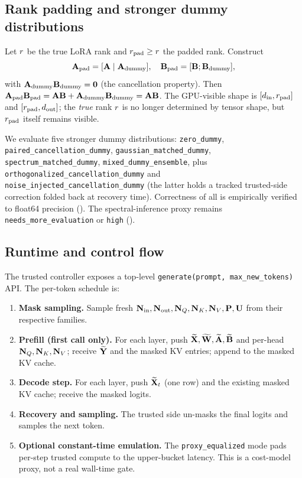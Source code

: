 \subsection{Rank padding and stronger dummy distributions}
\label{sec:design:rank-pad}
Let $r$ be the true LoRA rank and $r_{\mathrm{pad}} \geq r$ the padded rank. Construct
\begin{equation}
\mathbf{A}_{\mathrm{pad}} = [\mathbf{A} \mid \mathbf{A}_{\mathrm{dummy}}], \quad \mathbf{B}_{\mathrm{pad}} = [\mathbf{B}; \mathbf{B}_{\mathrm{dummy}}],
\end{equation}
with $\mathbf{A}_{\mathrm{dummy}}\mathbf{B}_{\mathrm{dummy}} = \mathbf{0}$ (the cancellation property). Then $\mathbf{A}_{\mathrm{pad}}\mathbf{B}_{\mathrm{pad}} = \mathbf{A}\mathbf{B} + \mathbf{A}_{\mathrm{dummy}}\mathbf{B}_{\mathrm{dummy}} = \mathbf{A}\mathbf{B}$. The GPU-visible shape is $[d_{\mathrm{in}}, r_{\mathrm{pad}}]$ and $[r_{\mathrm{pad}}, d_{\mathrm{out}}]$; the \emph{true} rank $r$ is no longer determined by tensor shape, but $r_{\mathrm{pad}}$ itself remains visible.

We evaluate five stronger dummy distributions: \texttt{zero\_dummy}, \texttt{paired\_cancellation\_dummy}, \texttt{gaussian\_matched\_dummy}, \texttt{spectrum\_matched\_dummy}, \texttt{mixed\_dummy\_ensemble}, plus \texttt{orthogonalized\_cancellation\_dummy} and \texttt{noise\_injected\_cancellation\_dummy} (the latter holds a tracked trusted-side correction folded back at recovery time). Correctness of all is empirically verified to float64 precision (). The spectral-inference proxy remains \texttt{needs\_more\_evaluation} or \texttt{high} ().

\subsection{Runtime and control flow}
\label{sec:design:runtime}
The trusted controller exposes a top-level \texttt{generate(prompt, max\_new\_tokens)} API. The per-token schedule is:

\begin{enumerate}[leftmargin=*, nosep]
  \item \textbf{Mask sampling.} Sample fresh $\mathbf{N}_{\mathrm{in}}, \mathbf{N}_{\mathrm{out}}, \mathbf{N}_{Q}, \mathbf{N}_{K}, \mathbf{N}_{V}, \mathbf{P}, \mathbf{U}$ from their respective families.
  \item \textbf{Prefill (first call only).} For each layer, push $\widetilde{\mathbf{X}}, \widetilde{\mathbf{W}}, \widetilde{\mathbf{A}}, \widetilde{\mathbf{B}}$ and per-head $\mathbf{N}_{Q}, \mathbf{N}_{K}, \mathbf{N}_{V}$; receive $\widetilde{\mathbf{Y}}$ and the masked KV entries; append to the masked KV cache.
  \item \textbf{Decode step.} For each layer, push $\widetilde{\mathbf{X}}_t$ (one row) and the existing masked KV cache; receive the masked logits.
  \item \textbf{Recovery and sampling.} The trusted side un-masks the final logits and samples the next token.
  \item \textbf{Optional constant-time emulation.} The \texttt{proxy\_equalized} mode pads per-step trusted compute to the upper-bucket latency. This is a cost-model proxy, not a real wall-time gate.
\end{enumerate}

